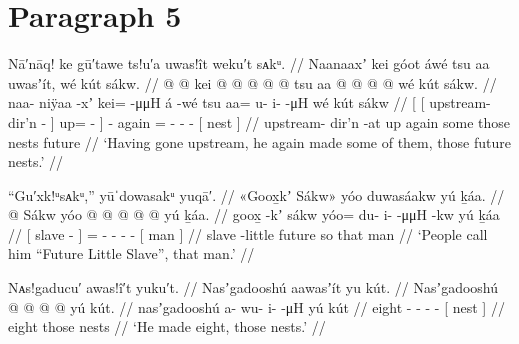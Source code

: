 \section{Paragraph 5}\label{sec:91-para-5}

\ex\label{ex:91-37-upstream-made-more-nests}%
%
\begingl
	\glpreamble	Nā′nāq! ke gū′tawe ts!u′a uwas!ît weku′t sᴀkᵘ. //
	\glpreamble	Naanaaxʼ kei góot áwé tsu aa uwasʼít, wé kút sákw. //
	\gla	{} {}  @ {} @ {} {}
			kei @  @ {} @ {} @ {} {}  @ {}
		tsu aa @  @ {} @ {} @ {}
		{} wé kút sákw. {} //
	\glb	{} {} naa- niÿaa -xʼ {}
			kei= {}  -μμH {} {} á -wé
		tsu aa= u- i-  -μH
		{} wé kút sákw {} //
	\glc	{}[ {}[ upstream- dir’n - {}]
			up= \·  - \· {}]  -
		again = - -  -
		{}[  nest  {}] //
	\gld	{} {} upstream- dir’n -at {}
			up  {} {} {} {}  {}
		again some  {} {} {}
		{} those nests future {} //
	\glft	‘Having gone upstream, he again made some of them, those future nests.’
		//
\endgl
\xe

\ex\label{ex:91-38-call-future-little-slave}%
%
\begingl
	\glpreamble	“Gu′xk!ᵘsᴀkᵘ,” yūˈdowasakᵘ yuqā′. //
	\glpreamble	«\!Goox̱kʼ Sákw\!» yóo duwasáakw yú ḵáa. //
	\gla	{}  @ {} Sákw {}
		yóo @  @ {} @ {} @ {} @ {}
		{} yú ḵáa. {} //
	\glb	{} goox̱ -kʼ sákw {}
		yóo= du- i-  -μμH -kw
		{} yú ḵáa {} //
	\glc	{}[ slave -  {}]
		= - -  - -
		{}[  man {}] //
	\gld	{} slave -little future {}
		so  {} {} {} {}
		{} that man {} //
	\glft	‘People call him “Future Little Slave”, that man.’
		//
\endgl
\xe

\ex\label{ex:91-39-made-eight-nests}%
%
\begingl
	\glpreamble	Nᴀs!gaducu′ awas!î′t yuku′t. //
	\glpreamble	Nasʼgadooshú aawasʼít yu kút. //
	\gla	Nasʼgadooshú  @ {} @ {} @ {} @ {}
		{} yú kút. {} //
	\glb	nasʼgadooshú a- wu- i-  -μH
		{} yú kút {} //
	\glc	eight - - -  -
		{}[  nest {}] //
	\gld	eight  {} {} {} {}
		{} those nests {} //
	\glft	‘He made eight, those nests.’
		//
\endgl
\xe

